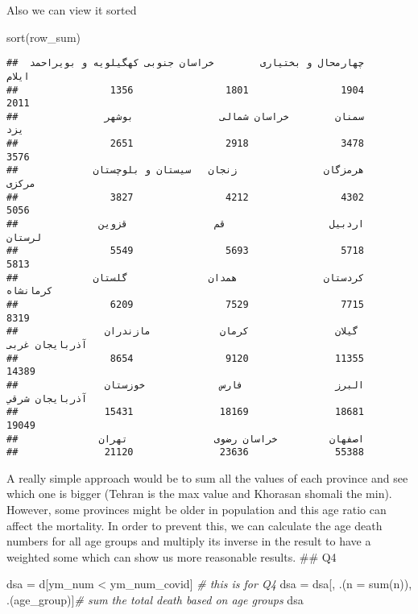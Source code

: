 \documentclass[
]{article}
\newenvironment{Shaded}{\begin{snugshade}}{\end{snugshade}}
\newcommand{\AttributeTok}[1]{\textcolor[rgb]{0.77,0.63,0.00}{#1}}
\newcommand{\CommentTok}[1]{\textcolor[rgb]{0.56,0.35,0.01}{\textit{#1}}}
\newcommand{\FunctionTok}[1]{\textcolor[rgb]{0.00,0.00,0.00}{#1}}
\newcommand{\NormalTok}[1]{#1}
\newcommand{\OtherTok}[1]{\textcolor[rgb]{0.56,0.35,0.01}{#1}}
\newcommand{\SpecialCharTok}[1]{\textcolor[rgb]{0.00,0.00,0.00}{#1}}
\begin{document}
Also we can view it sorted

\begin{Shaded}
\begin{Highlighting}[]
\FunctionTok{sort}\NormalTok{(row\_sum)}
\end{Highlighting}
\end{Shaded}

\begin{verbatim}
##  چهارمحال و بختیاری        خراسان جنوبی کهگیلویه و بویراحمد               ایلام 
##                1356                1801                1904                2011 
##               سمنان        خراسان شمالی               بوشهر                 یزد 
##                2651                2918                3478                3576 
##             هرمزگان               زنجان   سیستان و بلوچستان               مرکزی 
##                3827                4212                4302                5056 
##              اردبیل                  قم               قزوین              لرستان 
##                5549                5693                5718                5813 
##             کردستان               همدان              گلستان            کرمانشاه 
##                6209                7529                7715                8319 
##               گیلان               کرمان            مازندران      آذربايجان غربی 
##                8654                9120               11355               14389 
##               البرز                فارس             خوزستان      آذربايجان شرقي 
##               15431               18169               18681               19049 
##              اصفهان         خراسان رضوی               تهران 
##               21120               23636               55388
\end{verbatim}

A really simple approach would be to sum all the values of each province
and see which one is bigger (Tehran is the max value and Khorasan
shomali the min). However, some provinces might be older in population
and this age ratio can affect the mortality. In order to prevent this,
we can calculate the age death numbers for all age groups and multiply
its inverse in the result to have a weighted some which can show us more
reasonable results. \#\# Q4

\begin{Shaded}
\begin{Highlighting}[]
\NormalTok{dsa }\OtherTok{=}\NormalTok{ d[ym\_num }\SpecialCharTok{\textless{}}\NormalTok{ ym\_num\_covid] }\CommentTok{\# this is for Q4}
\NormalTok{dsa }\OtherTok{=}\NormalTok{ dsa[, .(}\AttributeTok{n =} \FunctionTok{sum}\NormalTok{(n)), .(age\_group)]}\CommentTok{\# sum the total death based on age groups}
\NormalTok{dsa}
\end{Highlighting}
\end{Shaded}
\end{document}

